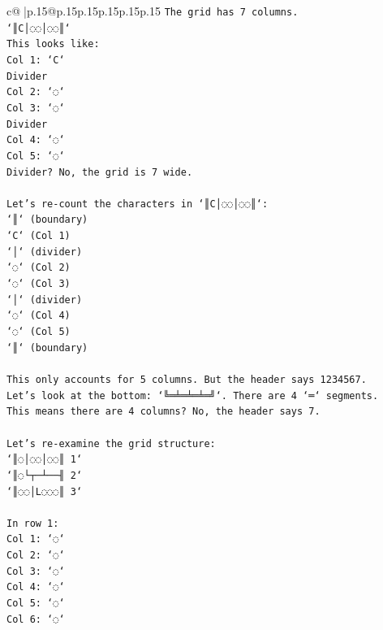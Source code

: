 \documentclass{article}
\begin{document}
{\begin{supertabular}{c@{$\;$}|p{.15\linewidth}@{}p{.15\linewidth}p{.15\linewidth}p{.15\linewidth}p{.15\linewidth}p{.15\linewidth}}
{{{\texttt{The grid has 7 columns.} \\
\texttt{`║C│◌◌│◌◌║`} \\
\texttt{This looks like:} \\
\texttt{Col 1: `C`} \\
\texttt{Divider} \\
\texttt{Col 2: `◌`} \\
\texttt{Col 3: `◌`} \\
\texttt{Divider} \\
\texttt{Col 4: `◌`} \\
\texttt{Col 5: `◌`} \\
\texttt{Divider? No, the grid is 7 wide.} \\
\\ 
\texttt{Let's re{-}count the characters in `║C│◌◌│◌◌║`:} \\
\texttt{`║` (boundary)} \\
\texttt{`C` (Col 1)} \\
\texttt{`│` (divider)} \\
\texttt{`◌` (Col 2)} \\
\texttt{`◌` (Col 3)} \\
\texttt{`│` (divider)} \\
\texttt{`◌` (Col 4)} \\
\texttt{`◌` (Col 5)} \\
\texttt{`║` (boundary)} \\
\\ 
\texttt{This only accounts for 5 columns. But the header says 1234567.} \\
\texttt{Let's look at the bottom: `╚═╧═╧═╧═╝`. There are 4 `═` segments.} \\
\texttt{This means there are 4 columns? No, the header says 7.} \\
\\ 
\texttt{Let's re{-}examine the grid structure:} \\
\texttt{`║◌│◌◌│◌◌║ 1`} \\
\texttt{`║◌└┬─┴──╢ 2`} \\
\texttt{`║◌◌│L◌◌◌║ 3`} \\
\\ 
\texttt{In row 1:} \\
\texttt{Col 1: `◌`} \\
\texttt{Col 2: `◌`} \\
\texttt{Col 3: `◌`} \\
\texttt{Col 4: `◌`} \\
\texttt{Col 5: `◌`} \\
\texttt{Col 6: `◌`} \\
}}}
\end{supertabular}}
\end{document}
